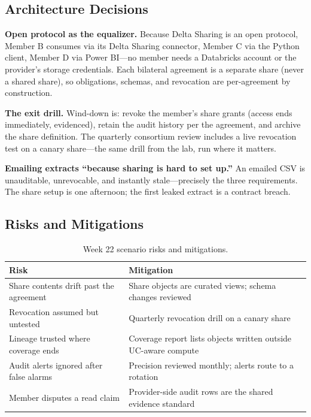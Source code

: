\subsection{Architecture Decisions}
\textbf{Open protocol as the equalizer.} Because Delta Sharing is an open protocol, Member B consumes via its Delta Sharing connector, Member C via the Python client, Member D via Power BI---no member needs a Databricks account or the provider's storage credentials. Each bilateral agreement is a separate share (never a shared share), so obligations, schemas, and revocation are per-agreement by construction.

\textbf{The exit drill.} Wind-down is: revoke the member's share grants (access ends immediately, evidenced), retain the audit history per the agreement, and archive the share definition. The quarterly consortium review includes a live revocation test on a canary share---the same drill from the lab, run where it matters.

\begin{pitfall}
\textbf{Emailing extracts ``because sharing is hard to set up.''} An emailed CSV is unauditable, unrevocable, and instantly stale---precisely the three requirements. The share setup is one afternoon; the first leaked extract is a contract breach.
\end{pitfall}

\subsection{Risks and Mitigations}
\begin{table}[H]
\centering
\small
\begin{tabular}{@{}p{4.6cm}p{7.6cm}@{}}
\toprule
\textbf{Risk} & \textbf{Mitigation} \\
\midrule
Share contents drift past the agreement & Share objects are curated views; schema changes reviewed \\
Revocation assumed but untested & Quarterly revocation drill on a canary share \\
Lineage trusted where coverage ends & Coverage report lists objects written outside UC-aware compute \\
Audit alerts ignored after false alarms & Precision reviewed monthly; alerts route to a rotation \\
Member disputes a read claim & Provider-side audit rows are the shared evidence standard \\
\bottomrule
\end{tabular}
\caption{Week 22 scenario risks and mitigations.}
\label{tab:ch22-risks}
\end{table}

